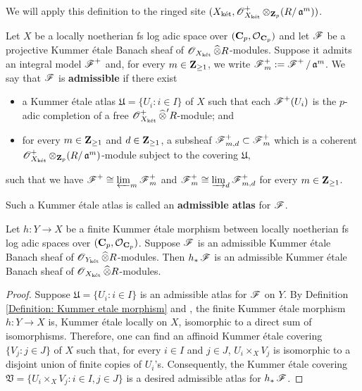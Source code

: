 We will apply this definition to the ringed site $(X_{\operatorname{\textrm{k\'{e}t}}}, \operatorname{\mathscr{O}}^+_{X_{\operatorname{\textrm{k\'{e}t}}}}\otimes_{\operatorname{\mathbf{Z}}_p} (R/\operatorname{\mathfrak{a}}^m))$.

\begin{Definition}\label{Definition: admissible Banach sheaf}
Let $X$ be a locally noetherian fs log adic space over $(\operatorname{\mathbf{C}}_p, \operatorname{\mathcal{O}}_{\operatorname{\mathbf{C}}_p})$ and let $\operatorname{\mathscr{F}}$ be a projective Kummer \'etale Banach sheaf of $\operatorname{\mathscr{O}}_{X_{\operatorname{\textrm{k\'{e}t}}}}\widehat{\otimes}R$-modules. Suppose it admits an integral model $\operatorname{\mathscr{F}}^+$ and, for every $m\in \operatorname{\mathbf{Z}}_{\geq 1}$, we write $\operatorname{\mathscr{F}}^+_m:=\operatorname{\mathscr{F}}^+/\operatorname{\mathfrak{a}}^m$. We say that $\operatorname{\mathscr{F}}$ is \textbf{admissible} if there exist
\begin{itemize}
\item a Kummer \'etale atlas $\mathfrak{U}=\{U_i: i\in I\}$ of $X$ such that each $\operatorname{\mathscr{F}}^+(U_i)$ is the $p$-adic completion of a free $\operatorname{\mathscr{O}}^+_{X_{\operatorname{\textrm{k\'{e}t}}}}\widehat{\otimes}'R$-module; and
\item for every $m\in \operatorname{\mathbf{Z}}_{\geq 1}$ and $d\in \operatorname{\mathbf{Z}}_{\geq 1}$, a subsheaf $\operatorname{\mathscr{F}}^+_{m,d}\subset \operatorname{\mathscr{F}}^+_m$ which is a coherent $\operatorname{\mathscr{O}}^+_{X_{\operatorname{\textrm{k\'{e}t}}}}\otimes_{\operatorname{\mathbf{Z}}_p} (R/\operatorname{\mathfrak{a}}^m)$-module subject to the covering $\mathfrak{U}$,
\end{itemize}
such that we have $\operatorname{\mathscr{F}}^+\cong\varprojlim_m \operatorname{\mathscr{F}}^+_m$ and $\operatorname{\mathscr{F}}_m^+\cong \varinjlim_d \operatorname{\mathscr{F}}^+_{m,d}$ for every $m\in \operatorname{\mathbf{Z}}_{\geq 1}$.

Such a Kummer \'etale atlas is called an \textbf{admissible atlas} for $\operatorname{\mathscr{F}}$.
\end{Definition}

\begin{Lemma}\label{Lemma: pushforward along finite Kummer etale map}
Let $h: Y\rightarrow X$ be a finite Kummer \'etale morphism between locally noetherian fs log adic spaces over $(\operatorname{\mathbf{C}}_p, \operatorname{\mathcal{O}}_{\operatorname{\mathbf{C}}_p})$. Suppose $\operatorname{\mathscr{F}}$ is an admissible Kummer \'etale Banach sheaf of $\operatorname{\mathscr{O}}_{Y_{\operatorname{\textrm{k\'{e}t}}}}\widehat{\otimes}R$-modules. Then $h_*\operatorname{\mathscr{F}}$ is an admissible Kummer \'etale Banach sheaf of $\operatorname{\mathscr{O}}_{X_{\operatorname{\textrm{k\'{e}t}}}}\widehat{\otimes}R$-modules.
\end{Lemma}

\begin{proof}
Suppose $\mathfrak{U}=\{U_i:i\in I\}$ is an admissible atlas for $\operatorname{\mathscr{F}}$ on $Y$. By Definition \ref{Definition: Kummer etale morphism} and \cite[Proposition 4.1.6]{Diao}, the finite Kummer \'etale morphism $h:Y\rightarrow X$ is, Kummer \'etale locally on $X$, isomorphic to a direct sum of isomorphisms. Therefore, one can find an affinoid Kummer \'etale covering $\{V_j: j\in J\}$ of $X$ such that, for every $i\in I$ and $j\in J$, $U_i\times_X V_j$ is isomorphic to a disjoint union of finite copies of $U_i$'s. Consequently, the Kummer \'etale covering $\mathfrak{V}=\{U_i\times_X V_j: i\in I, j\in J\}$ is a desired admissible atlas for $h_*\operatorname{\mathscr{F}}$.
\end{proof}

